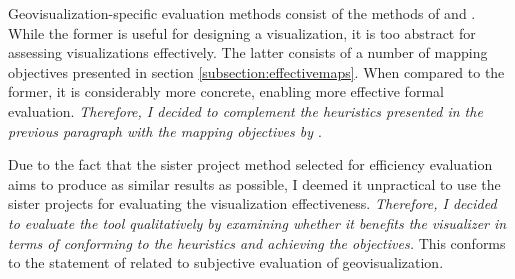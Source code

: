 Geovisualization-specific evaluation methods consist of the methods of \citet{kraak_cartographic_1998} and \citet{schlichtmann_visualization_2002}. While the former is useful for designing a visualization, it is too abstract for assessing visualizations effectively. The latter consists of a number of mapping objectives presented in section \ref{subsection:effectivemaps}. When compared to the former, it is considerably more concrete, enabling more effective formal evaluation. \emph{Therefore, I decided to complement the heuristics presented in the previous paragraph with the mapping objectives by \citet{schlichtmann_visualization_2002}}.

Due to the fact that the sister project method selected for efficiency evaluation aims to produce as similar results as possible, I deemed it unpractical to use the sister projects for evaluating the visualization effectiveness. \emph{Therefore, I decided to evaluate the tool qualitatively by examining whether it benefits the visualizer in terms of conforming to the heuristics and achieving the objectives.} This conforms to the statement of \citet{kraak_cartographic_1998} related to subjective evaluation of geovisualization.
